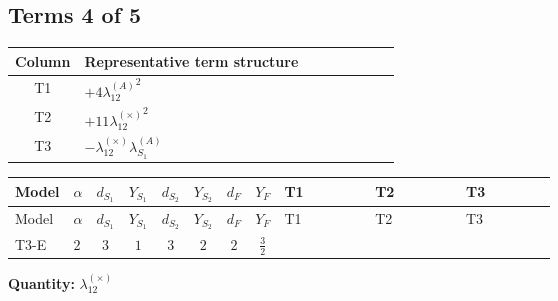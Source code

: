 \documentclass[8pt]{article}
\begin{document}
\begin{landscape}
\subsection*{Terms 4 of 5}
\begin{center}
\begin{tabular}{@{}c >{\raggedright\arraybackslash}p{0.82\linewidth}@{}}
\toprule
Column & Representative term structure \\
\midrule
T1 & \(\displaystyle +4 {\lambda_{12}^{(A)}}^2\) \\
\midrule
T2 & \(\displaystyle +11 {\lambda_{12}^{(\times)}}^2\) \\
\midrule
T3 & \(\displaystyle -{\lambda_{12}^{(\times)}} {\lambda_{S_1}^{(A)}}\) \\
\midrule
\bottomrule
\end{tabular}
\end{center}
\smallskip
\tiny
\begin{longtable}{@{}llcccccc >{\raggedright\arraybackslash}p{0.21\linewidth} >{\raggedright\arraybackslash}p{0.21\linewidth} >{\raggedright\arraybackslash}p{0.21\linewidth}@{}}
\toprule
Model & $\alpha$ & $d_{S_1}$ & $Y_{S_1}$ & $d_{S_2}$ & $Y_{S_2}$ & $d_F$ & $Y_F$ & T1 & T2 & T3 \\
\midrule
\endfirsthead
\toprule
Model & $\alpha$ & $d_{S_1}$ & $Y_{S_1}$ & $d_{S_2}$ & $Y_{S_2}$ & $d_F$ & $Y_F$ & T1 & T2 & T3 \\
\midrule
\endhead
T3-E & $2$ & $3$ & $1$ & $3$ & $2$ & $2$ & $\frac{3}{2}$ & \scriptsize\adjustbox{max width=\linewidth}{$\begin{gathered} +4 {\lambda_{12}^{(A)}}^2\end{gathered}$} & \scriptsize\adjustbox{max width=\linewidth}{$\begin{gathered} +11 {\lambda_{12}^{(\times)}}^2\end{gathered}$} & \scriptsize\adjustbox{max width=\linewidth}{$\begin{gathered} -{\lambda_{12}^{(\times)}} {\lambda_{S_1}^{(A)}}\end{gathered}$} \\
\midrule
\bottomrule
\end{longtable}
\clearpage
\noindent\textbf{Quantity: }$\lambda_{12}^{(\times)}$\par\smallskip

\end{landscape}
\end{document}
